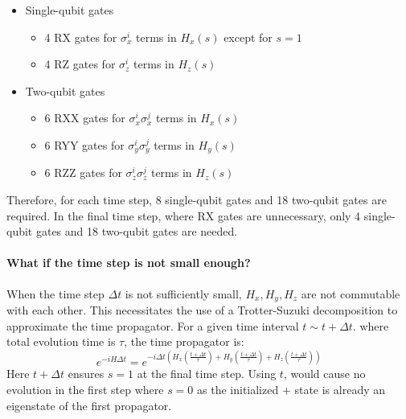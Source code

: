 \documentclass[a4paper, 11pt]{article}
\begin{document}
\begin{itemize}
  \item Single-qubit gates
  \begin{itemize}
    \item 4 RX gates for $\sigma_x^{i}$ terms in $H_x (s)$ except for $s=1$
    \item 4 RZ gates for $\sigma_z^{i}$ terms in $H_z (s)$
  \end{itemize}
  \item Two-qubit gates
  \begin{itemize}
    \item 6 RXX gates for $\sigma_x^{i}\sigma_x^{j}$ terms in $H_x(s)$
    \item 6 RYY gates for $\sigma_y^{i}\sigma_y^{j}$ terms in $H_y(s)$
    \item 6 RZZ gates for $\sigma_z^{i}\sigma_z^{j}$ terms in $H_z(s)$
  \end{itemize}
\end{itemize}

Therefore, for each time step, 8 single-qubit gates and 18 two-qubit gates are required. In the final time step, where 
RX gates are unnecessary, only 4 single-qubit gates and 18 two-qubit gates are needed.

\paragraph{What if the time step is not small enough?}

When the time step $\Delta t$ is not sufficiently small, $H_{x}, H_{y}, H_{z}$ are not commutable with each other.
This necessitates the use of a Trotter-Suzuki decomposition to approximate the time propagator\cite{Wittek_2013, Berry_2006, 30b65616453b4429964771f7ea0f7186}. For a given time interval $t \sim t + \Delta t$.
where total evolution time is $\tau$, the time propagator is:
\begin{equation}
  e^{-i H \Delta t} = e^{-i \Delta t \left(H_x\left(\frac{t+\Delta t}{\tau}\right)+H_y\left(\frac{t+\Delta t}{\tau}\right)+H_z\left(\frac{t+\Delta t}{\tau}\right)\right) }
\end{equation}
Here $t+\Delta t$ ensures $s=1$ at the final time step. 
Using $t$, would cause no evolution in the first step where $s=0$ as the initialized $+$ state is already an eigenstate of the first propagator.
\end{document}
